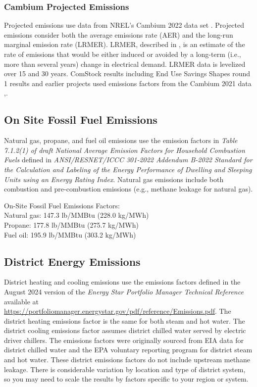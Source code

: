 \subsubsection{Cambium Projected Emissions}
Projected emissions use data from NREL's Cambium 2022 data set \citep{cambium2022}. Projected emissions consider both the average emissions rate (AER) and the long-run marginal emission rate (LRMER).  LRMER, described in \cite{GAGNON2022103915}, is an estimate of the rate of emissions that would be either induced or avoided by a long-term (i.e., more than several years) change in electrical demand.  LRMER data is levelized over 15 and 30 years\citep{cambium2022}. ComStock results including End Use Savings Shapes round 1 results and earlier projects used emissions factors from the Cambium 2021 data \citep{cambium2021},\citep{lrmer_data2022}.

\subsection{On Site Fossil Fuel Emissions}
Natural gas, propane, and fuel oil emissions use the emission factors in \textit{Table 7.1.2(1) of draft National Average Emission Factors for Household Combustion Fuels} defined in \textit{ANSI/RESNET/ICCC 301-2022 Addendum B-2022 Standard for the Calculation and Labeling of the Energy Performance of Dwelling and Sleeping Units using an Energy Rating Index}. Natural gas emissions include both combustion and pre-combustion emissions (e.g., methane leakage for natural gas).

On-Site Fossil Fuel Emissions Factors:\\
Natural gas: 147.3 lb/MMBtu (228.0 kg/MWh)\\
Propane: 177.8 lb/MMBtu (275.7 kg/MWh)\\
Fuel oil: 195.9 lb/MMBtu (303.2 kg/MWh)\\

\subsection{District Energy Emissions}
District heating and cooling emissions use the emissions factors defined in the August 2024 version of the \textit{Energy Star Portfolio Manager Technical Reference} available at \url{https://portfoliomanager.energystar.gov/pdf/reference/Emissions.pdf}. The district heating emissions factor is the same for both steam and hot water. The district cooling emissions factor assumes district chilled water served by electric driver chillers. The emissions factors were originally sourced from EIA data for district chilled water and the EPA voluntary reporting program for district steam and hot water. These district emissions factors do not include upstream methane leakage. There is considerable variation by location and type of district system, so you may need to scale the results by factors specific to your region or system.

